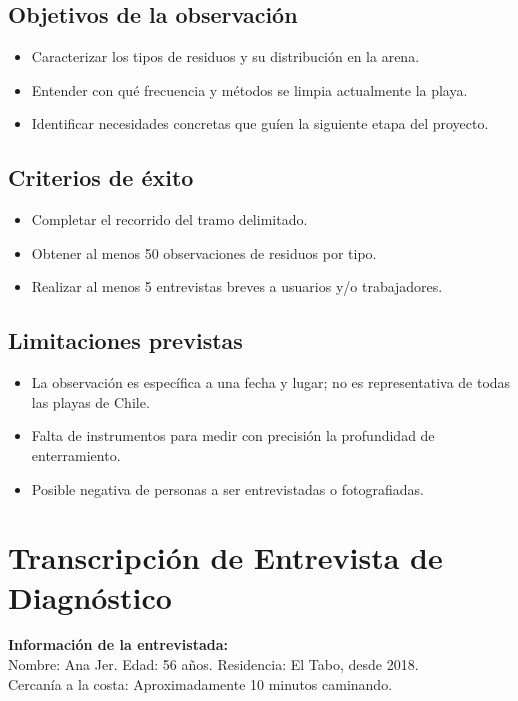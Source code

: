 \documentclass[12pt, letterpaper]{article}
\begin{document}
\subsection*{Objetivos de la observación}
\begin{itemize}
	\item Caracterizar los tipos de residuos y su distribución en la arena.
	\item Entender con qué frecuencia y métodos se limpia actualmente la playa.
	\item Identificar necesidades concretas que guíen la siguiente etapa del proyecto.
\end{itemize}

\subsection*{Criterios de éxito}
\begin{itemize}
	\item Completar el recorrido del tramo delimitado.
	\item Obtener al menos 50 observaciones de residuos por tipo.
	\item Realizar al menos 5 entrevistas breves a usuarios y/o trabajadores.
\end{itemize}

\subsection*{Limitaciones previstas}
\begin{itemize}
	\item La observación es específica a una fecha y lugar;
	      no es representativa de todas las playas de Chile.
	\item Falta de instrumentos para medir con precisión
	      la profundidad de enterramiento.
	\item Posible negativa de personas a ser entrevistadas o fotografiadas.
\end{itemize}

\section{Transcripción de Entrevista de Diagnóstico}
\label{anexo:entrevista}

\textbf{Información de la entrevistada:}\\
Nombre: Ana Jer. Edad: 56 años. Residencia: El Tabo, desde 2018.\\
Cercanía a la costa: Aproximadamente 10 minutos caminando.
\end{document}
